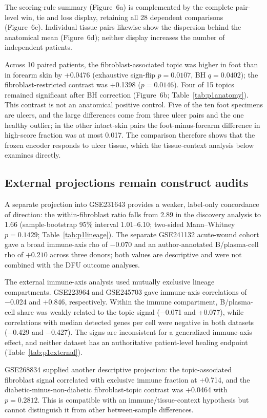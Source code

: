 \documentclass[10pt,a4paper]{article}
\begin{document}
The scoring-rule summary (Figure~6a\label{call:p1f8}) is complemented by the complete pair-level win, tie and loss display, retaining all 28 dependent comparisons (Figure~6c). Individual tissue pairs likewise show the dispersion behind the anatomical mean (Figure~6d); neither display increases the number of independent patients.

Across 10 paired patients, the fibroblast-associated topic was higher in foot than in forearm skin by +0.0476 (exhaustive sign-flip $p=0.0107$, BH $q=0.0402$); the fibroblast-restricted contrast was +0.1398 ($p=0.0146$). Four of 15 topics remained significant after BH correction (Figure~6b; Table~\ref{tab:p1anatomy}). This contrast is not an anatomical positive control. Five of the ten foot specimens are ulcers, and the large differences come from three ulcer pairs and the one healthy outlier; in the other intact-skin pairs the foot-minus-forearm difference in high-score fraction was at most 0.017. The comparison therefore shows that the frozen encoder responds to ulcer tissue, which the tissue-context analysis below examines directly.

\subsection{External projections remain construct audits}

A separate projection into GSE231643 provides a weaker, label-only concordance of direction: the within-fibroblast ratio falls from 2.89 in the discovery analysis to 1.66 (sample-bootstrap 95\% interval 1.01--6.10; two-sided Mann--Whitney $p=0.1429$; Table~\ref{tab:p1lineage}). The separate GSE241132 acute-wound cohort gave a broad immune-axis rho of $-0.070$ and an author-annotated B/plasma-cell rho of $+0.210$ across three donors; both values are descriptive and were not combined with the DFU outcome analyses.

The external immune-axis analysis used mutually exclusive lineage compartments. GSE223964 and GSE245703 gave immune-axis correlations of −0.024 and +0.846, respectively. Within the immune compartment, B/plasma-cell share was weakly related to the topic signal (−0.071 and +0.077), while correlations with median detected genes per cell were negative in both datasets (−0.429 and −0.427). The signs are inconsistent for a generalized immune-axis effect, and neither dataset has an authoritative patient-level healing endpoint (Table~\ref{tab:p1external}).

GSE268834 supplied another descriptive projection: the topic-associated fibroblast signal correlated with exclusive immune fraction at +0.714, and the diabetic-minus-non-diabetic fibroblast-topic contrast was +0.0464 with $p=0.2812$. This is compatible with an immune/tissue-context hypothesis but cannot distinguish it from other between-sample differences.
\end{document}
